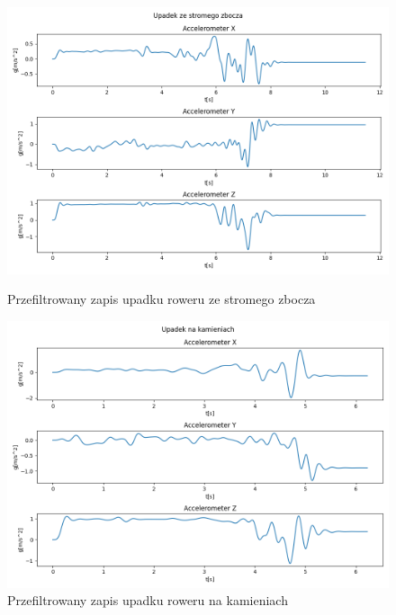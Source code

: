 \begin{figure}[H]
    \centering
    \includegraphics[width=15cm]{Graphics/slope_title.png}
    \caption{Przefiltrowany zapis upadku roweru ze stromego zbocza}
    \label{img:slope}
    \vspace{0.5cm}
    \centering
    \includegraphics[width=15cm]{Graphics/Stones_title.png}
    \caption{Przefiltrowany zapis upadku roweru na kamieniach}
    \label{img:stones}
\end{figure}
